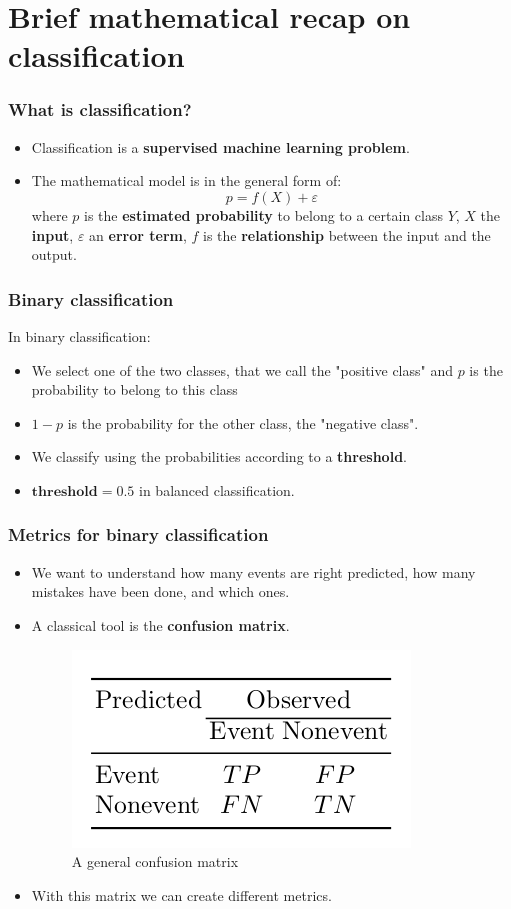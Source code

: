 \documentclass[9pt]{beamer}
\begin{document}
\section{Brief mathematical recap on classification}
\begin{frame}
\frametitle{What is classification?}
\begin{itemize}
\item<1 -> Classification is a \textbf{supervised machine learning problem}.
\item<2 -> The mathematical model is in the general form of:
$$
p = f(X) + \varepsilon
$$
where $p$ is the \textbf{estimated probability} to belong to a certain class $Y$, $X$ the \textbf{input}, $\varepsilon$ an \textbf{error term}, $f$ is the \textbf{relationship} between the input and the output.
\end{itemize}
\end{frame}

\begin{frame}
\frametitle{Binary classification}
In binary classification:
\begin{itemize}
\item<1-> We select one of the two classes, that we call the "positive class" and $p$ is the probability to belong to this class
\item<2 -> $1-p$ is the probability for the other class, the "negative class".
\item<3 -> We classify using the probabilities according to a \textbf{threshold}.
\item<4 -> $\textbf{threshold} = 0.5$ in balanced classification.
\end{itemize}
\end{frame}

\begin{frame}
\frametitle{Metrics for binary classification}
\begin{itemize}
\item<1 -> We want to understand how many events are right predicted, how many mistakes have been done, and which ones.
\item<2 -> A classical tool is the \textbf{confusion matrix}.
\begin{figure}[ht]
\includegraphics[scale=0.25]{images/confusionmatrix.png}
\caption{A general confusion matrix}
\end{figure}
\item<3 -> With this matrix we can create different metrics.
\end{itemize}
\end{frame}
\end{document}
